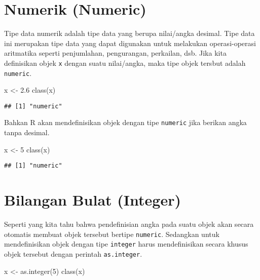 \documentclass[
]{book}
\newenvironment{Shaded}{\begin{snugshade}}{\end{snugshade}}
\newcommand{\DecValTok}[1]{\textcolor[rgb]{0.00,0.00,0.81}{#1}}
\newcommand{\FloatTok}[1]{\textcolor[rgb]{0.00,0.00,0.81}{#1}}
\newcommand{\FunctionTok}[1]{\textcolor[rgb]{0.00,0.00,0.00}{#1}}
\newcommand{\NormalTok}[1]{#1}
\newcommand{\OtherTok}[1]{\textcolor[rgb]{0.56,0.35,0.01}{#1}}
\begin{document}
\hypertarget{numeric}{%
\section{Numerik (Numeric)}\label{numeric}}

Tipe data numerik adalah tipe data yang berupa nilai/angka desimal. Tipe data ini merupakan tipe data yang dapat digunakan untuk melakukan operasi-operasi aritmatika seperti penjumlahan, pengurangan, perkailan, dsb. Jika kita definisikan objek \texttt{x} dengan suatu nilai/angka, maka tipe objek tersbut adalah \texttt{numeric}.

\begin{Shaded}
\begin{Highlighting}[]
\NormalTok{x }\OtherTok{\textless{}{-}} \FloatTok{2.6}
\FunctionTok{class}\NormalTok{(x)}
\end{Highlighting}
\end{Shaded}

\begin{verbatim}
## [1] "numeric"
\end{verbatim}

Bahkan R akan mendefinisikan objek dengan tipe \texttt{numeric} jika berikan angka tanpa desimal.

\begin{Shaded}
\begin{Highlighting}[]
\NormalTok{x }\OtherTok{\textless{}{-}} \DecValTok{5}
\FunctionTok{class}\NormalTok{(x)}
\end{Highlighting}
\end{Shaded}

\begin{verbatim}
## [1] "numeric"
\end{verbatim}

\hypertarget{integer}{%
\section{Bilangan Bulat (Integer)}\label{integer}}

Seperti yang kita tahu bahwa pendefinisian angka pada suatu objek akan secara otomatis membuat objek tersebut bertipe \texttt{numeric}. Sedangkan untuk mendefinisikan objek dengan tipe \texttt{integer} harus mendefinisikan secara khusus objek tersebut dengan perintah \texttt{as.integer}.

\begin{Shaded}
\begin{Highlighting}[]
\NormalTok{x }\OtherTok{\textless{}{-}} \FunctionTok{as.integer}\NormalTok{(}\DecValTok{5}\NormalTok{)}
\FunctionTok{class}\NormalTok{(x)}
\end{Highlighting}
\end{Shaded}
\end{document}
